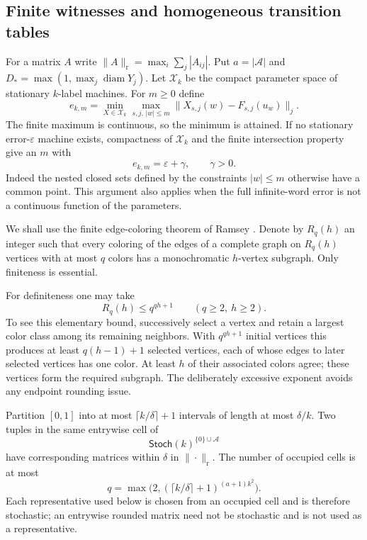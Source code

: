 \subsection{Finite witnesses and homogeneous transition tables}
For a matrix $A$ write $\|A\|_{\mathrm r}=\max_i\sum_j|A_{ij}|$. Put $a=|\mathcal A|$ and $D_* =\max(1,\max_j\operatorname{diam}Y_j)$. Let $\mathcal X_k$ be the compact parameter space of stationary $k$-label machines. For $m\ge0$ define
\[
 e_{k,m}=\min_{X\in\mathcal X_k}\max_{s,j,\,|w|\le m}
               \|X_{s,j}(w)-F_{s,j}(u_w)\|_j.
\]
The finite maximum is continuous, so the minimum is attained. If no stationary error-$\varepsilon$ machine exists, compactness of $\mathcal X_k$ and the finite intersection property give an $m$ with
\begin{equation}\label{eq:finitewitness56}
                       e_{k,m}=\varepsilon+\gamma,\qquad\gamma>0.
\end{equation}
Indeed the nested closed sets defined by the constraints $|w|\le m$ otherwise have a common point. This argument also applies when the full infinite-word error is not a continuous function of the parameters.

We shall use the finite edge-coloring theorem of Ramsey \cite{Ramsey}. Denote by $R_q(h)$ an integer such that every coloring of the edges of a complete graph on $R_q(h)$ vertices with at most $q$ colors has a monochromatic $h$-vertex subgraph. Only finiteness is essential.

\begin{remark}
For definiteness one may take
\begin{equation}\label{eq:ramseybound56}
                   R_q(h)\le q^{qh+1}\qquad(q\ge2,\ h\ge2).
\end{equation}
To see this elementary bound, successively select a vertex and retain a largest color class among its remaining neighbors. With $q^{qh+1}$ initial vertices this produces at least $q(h-1)+1$ selected vertices, each of whose edges to later selected vertices has one color. At least $h$ of their associated colors agree; these vertices form the required subgraph. The deliberately excessive exponent avoids any endpoint rounding issue.
\end{remark}

Partition $[0,1]$ into at most $\lceil k/\delta\rceil+1$ intervals of length at most $\delta/k$. Two tuples in the same entrywise cell of
\[
                  \mathsf{Stoch}(k)^{\{0\}\cup\mathcal A}
\]
have corresponding matrices within $\delta$ in $\|\cdot\|_{\mathrm r}$. The number of occupied cells is at most
\begin{equation}\label{eq:colors56}
             q=\max\bigl(2,(\lceil k/\delta\rceil+1)^{(a+1)k^2}\bigr).
\end{equation}
Each representative used below is chosen from an occupied cell and is therefore stochastic; an entrywise rounded matrix need not be stochastic and is not used as a representative.


